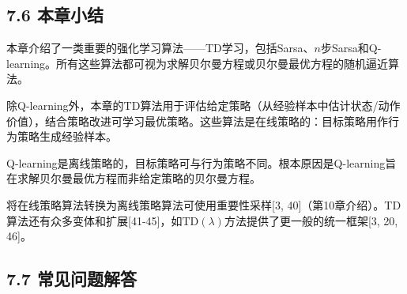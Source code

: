 \documentclass[UTF8]{article}
\begin{document}
\subsection*{7.6 本章小结}

本章介绍了一类重要的强化学习算法——TD学习，包括Sarsa、$n$步Sarsa和Q-learning。所有这些算法都可视为求解贝尔曼方程或贝尔曼最优方程的随机逼近算法。

除Q-learning外，本章的TD算法用于评估给定策略（从经验样本中估计状态/动作价值），结合策略改进可学习最优策略。这些算法是在线策略的：目标策略用作行为策略生成经验样本。

Q-learning是离线策略的，目标策略可与行为策略不同。根本原因是Q-learning旨在求解贝尔曼最优方程而非给定策略的贝尔曼方程。

将在线策略算法转换为离线策略算法可使用重要性采样[3, 40]（第10章介绍）。TD算法还有众多变体和扩展[41-45]，如$\text{TD}(\lambda)$方法提供了更一般的统一框架[3, 20, 46]。

\subsection*{7.7 常见问题解答}
\end{document}
